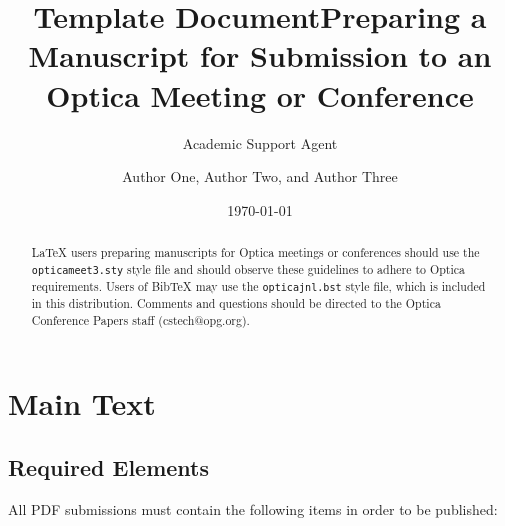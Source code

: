 \documentclass{article}
\title{Template Document}
\author{Academic Support Agent}
\date{\today}
\begin{document}
\maketitle

\title{Preparing a Manuscript for Submission to an Optica Meeting or Conference}


\author{Author One, Author Two, and Author Three}

\address{ Publications Department, Optica Publishing Group, 2010 Massachusetts Avenue NW, Washington, DC 20036\\
Publications Department, Optica Publishing Group, 2010 Massachusetts Avenue NW, Washington, DC 20036\\
Currently with the Department of Electronic Journals, Optica Publishing Group, 2010 Massachusetts Avenue NW, Washington, DC 20036}




\begin{abstract}
\LaTeX{} users preparing manuscripts for Optica meetings or conferences
should use  the \texttt{opticameet3.sty} style file and should observe these
guidelines to adhere to Optica requirements. Users of Bib\TeX{} may use the \texttt{opticajnl.bst} style file, which is included in this distribution. Comments and questions should be directed to the Optica Conference Papers staff (cstech@opg.org).
\end{abstract}

\section{Main Text}

\subsection{Required Elements}
All PDF submissions must contain the following items in order to be published:
\end{document}
